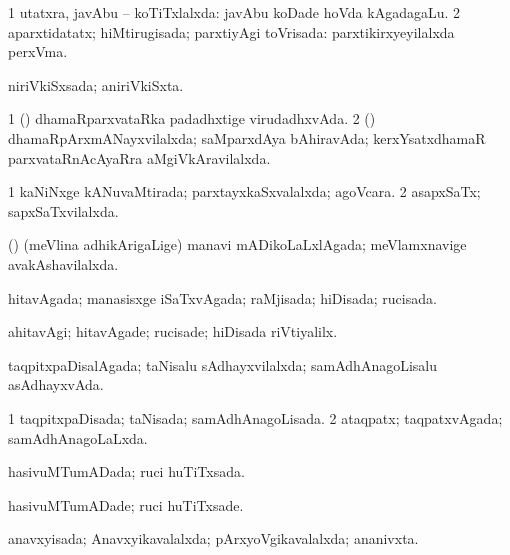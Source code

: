 \bentry
{} 
\gl{\gu}
\expl{}
\bmng
\bnum
\num{1} utatxra, javAbu -- koTiTxlalxda:  javAbu koDade hoVda kAgadagaLu. 
\num{2} aparxtidatatx; hiMtirugisada; parxtiyAgi toVrisada:  parxtikirxyeyilalxda perxVma. 
\enum
\emng
\eentry

\bentry
{} 
\gl{\gu}
\expl{}
\bmng
niriVkiSxsada; aniriVkiSxta. 
\emng
\eentry

\bentry
{} 
\gl{\gu}
\expl{}
\bmng
\bnum
\num{1} (\kerxY) dhamaRparxvataRka padadhxtige virudadhxvAda. 
\num{2} (\kerxY) dhamaRpArxmANayxvilalxda; saMparxdAya bAhiravAda; kerxYsatxdhamaR parxvataRnAcAyaRra aMgiVkAravilalxda. 
\enum
\emng
\eentry

\bentry
{} 
\gl{\gu}
\expl{}
\bmng
\bnum
\num{1} kaNiNxge kANuvaMtirada; parxtayxkaSxvalalxda; agoVcara. 
\num{2} asapxSaTx; sapxSaTxvilalxda. 
\enum
\emng
\eentry

\bentry
{} 
\gl{\gu}
\expl{}
\bmng
(\nAyxshA) (meVlina adhikArigaLige) manavi mADikoLaLxlAgada; meVlamxnavige avakAshavilalxda. 
\emng
\eentry

\bentry
{} 
\gl{\gu}
\expl{}
\bmng
hitavAgada; manasisxge iSaTxvAgada; raMjisada; hiDisada; rucisada. 
\emng
\eentry

\bentry
{} 
\gl{\kirxvi}
\expl{}
\bmng
ahitavAgi; hitavAgade; rucisade; hiDisada riVtiyalilx. 
\emng
\eentry

\bentry
{} 
\gl{\gu}
\expl{}
\bmng
taqpitxpaDisalAgada; taNisalu sAdhayxvilalxda; samAdhAnagoLisalu asAdhayxvAda. 
\emng
\eentry

\bentry
{} 
\gl{\gu}
\expl{}
\bmng
\bnum
\num{1} taqpitxpaDisada; taNisada; samAdhAnagoLisada. 
\num{2} ataqpatx; taqpatxvAgada; samAdhAnagoLaLxda. 
\enum
\emng
\eentry

\bentry
{} 
\gl{\gu}
\expl{}
\bmng
hasivuMTumADada; ruci huTiTxsada. 
\emng
\eentry

\bentry
{} 
\gl{\kirxvi}
\expl{}
\bmng
hasivuMTumADade; ruci huTiTxsade. 
\emng
\eentry

\bentry
{} 
\gl{\gu}
\expl{}
\bmng
anavxyisada; Anavxyikavalalxda; pArxyoVgikavalalxda; ananivxta. 
\emng
\eentry

